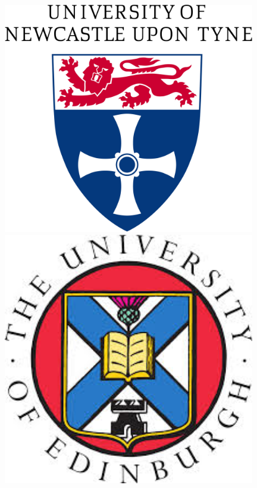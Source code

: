 \documentclass[a0,portrait]{a0poster}
\begin{document}
\begin{minipage}[b]{0.25\linewidth}
\includegraphics[width=11cm]{ncltitle2.jpg}\includegraphics[width=11cm]{edin.jpg}\\
\end{minipage}


\end{document}
